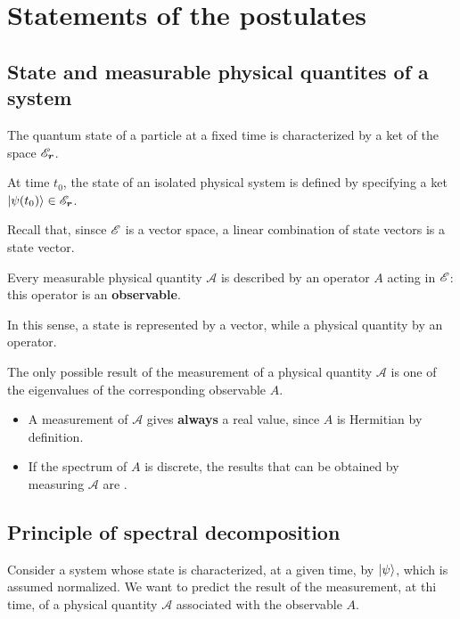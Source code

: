 \section{Statements of the postulates}
\subsection{State and measurable physical quantites of a system}
The quantum state of a particle at a fixed time is characterized by a ket of the space $\mathscr{E}_{\bm{r}}$.
\begin{definition}
    At time $t_0$, the state of an isolated physical system is defined by specifying a ket $|\psi(t_0)\rangle\in\mathscr{E}_{\bm{r}}$. 
\end{definition}
Recall that, sinsce $\mathscr{E}$ is a vector space, a linear combination of state vectors is a state vector.

\begin{definition}
    Every measurable physical quantity $\mathcal{A}$ is described by an operator $A$ acting in $\mathscr{E}$: this operator is an \textbf{observable}.
\end{definition}
In this sense, a state is represented by a vector, while a physical quantity by an operator.

\begin{definition}
    The only possible result of the measurement of a physical quantity $\mathcal{A}$ is one of the eigenvalues of the corresponding observable $A$.
\end{definition}
\begin{itemize}[itemsep=0pt,topsep=0pt]
    \item A measurement of $\mathcal{A}$ gives \textbf{always} a real value, since $A$ is Hermitian by definition.
    \item If the spectrum of $A$ is discrete, the results that can be obtained by measuring $\mathcal{A}$ are .
\end{itemize}
\subsection{Principle of spectral decomposition}
Consider a system whose state is characterized, at a given time, by $|\psi\rangle$, which is assumed normalized. We want to predict the result of the measurement,
at thi time, of a physical quantity $\mathcal{A}$ associated with the observable $A$.
%

